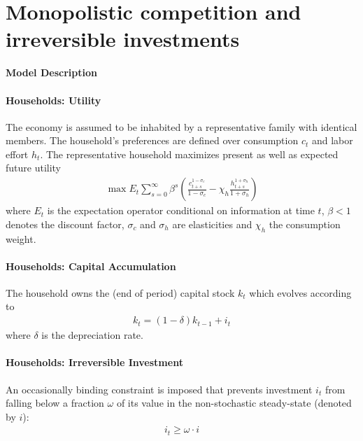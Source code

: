 \documentclass{article}
\begin{document}
\newpage

\section[Monopolistic competition and irreversible investments]{Monopolistic competition and irreversible investments\label{ex:RBCModelMonCompIrrInvest}}

\begin{center} \Large \textbf{Model Description} \end{center}

\paragraph{Households: Utility}
The economy is assumed to be inhabited by a representative family with identical members.
The household's preferences are defined over consumption $c_t$
  and labor effort $h_t$.
The representative household maximizes present as well as expected future utility
\begin{align}
	\max E_t \sum_{s=0}^{\infty} \beta^{s} \left( \frac{c_{t+s}^{1-\sigma_c}}{1-\sigma_c} - \chi_h \frac{h_{t+s}^{1+\sigma_h}}{1+\sigma_h} \right)\label{eq:RBCMonopIrrInv.UtilityLifetime}
\end{align}
where $E_t$ is the expectation operator conditional on information at time $t$,
  $\beta <1$ denotes the discount factor,
  $\sigma_c$ and $\sigma_h$ are elasticities and $\chi_h$ the consumption weight.

\paragraph{Households: Capital Accumulation}
The household owns the (end of period) capital stock $k_t$ which evolves according to
\begin{align}
k_t = (1-\delta)k_{t-1} + i_t \label{eq:RBCMonopIrrInv.CapitalAccumulation}
\end{align}
where $\delta$ is the depreciation rate.

\paragraph{Households: Irreversible Investment}
An occasionally binding constraint is imposed that prevents investment $i_t$ from falling below a fraction $\omega$
  of its value in the non-stochastic steady-state (denoted by $i$):
\begin{align}
i_t \geq \omega \cdot i \label{eq:RBCMonopIrrInv.IrrInvest}
\end{align}
\end{document}
